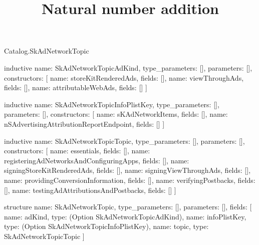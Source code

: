 \begin{lexlean}{Catalog.SkAdNetworkTopic}
\title{Natural number addition}
\begin{semanticmodule}
inductive{
  name: SkAdNetworkTopicAdKind,
  type_parameters: [],
  parameters: [],
  constructors: [
    {name: storeKitRenderedAds, fields: []},
    {name: viewThroughAds, fields: []},
    {name: attributableWebAds, fields: []}
  ]
}

inductive{
  name: SkAdNetworkTopicInfoPlistKey,
  type_parameters: [],
  parameters: [],
  constructors: [
    {name: sKAdNetworkItems, fields: []},
    {name: nSAdvertisingAttributionReportEndpoint, fields: []}
  ]
}

inductive{
  name: SkAdNetworkTopicTopic,
  type_parameters: [],
  parameters: [],
  constructors: [
    {name: essentials, fields: []},
    {name: registeringAdNetworksAndConfiguringApps, fields: []},
    {name: signingStoreKitRenderedAds, fields: []},
    {name: signingViewThroughAds, fields: []},
    {name: providingConversionInformation, fields: []},
    {name: verifyingPostbacks, fields: []},
    {name: testingAdAttributionsAndPostbacks, fields: []}
  ]
}

structure{
  name: SkAdNetworkTopic,
  type_parameters: [],
  parameters: [],
  fields: [
    {name: adKind, type: (Option SkAdNetworkTopicAdKind)},
    {name: infoPlistKey, type: (Option SkAdNetworkTopicInfoPlistKey)},
    {name: topic, type: SkAdNetworkTopicTopic}
  ]
}
\end{semanticmodule}
\end{lexlean}
